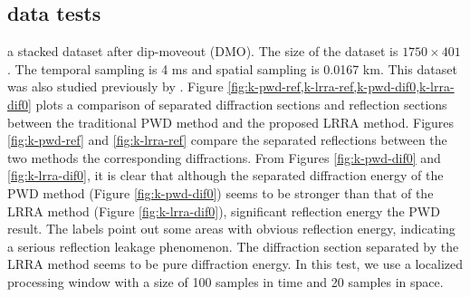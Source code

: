 \subsection{ data tests}
 a stacked dataset after  dip-moveout (DMO). The size of the dataset is $1750\times 401$. The temporal sampling is 4 ms and spatial sampling is 0.0167 km. This dataset was also studied previously by \cite{decker2017diffraction}. Figure \ref{fig:k-pwd-ref,k-lrra-ref,k-pwd-dif0,k-lrra-dif0} plots a comparison of separated diffraction sections and reflection sections between the traditional PWD method and the proposed LRRA method. Figures \ref{fig:k-pwd-ref} and \ref{fig:k-lrra-ref} compare the separated reflections between the two methods the corresponding diffractions. From Figures \ref{fig:k-pwd-dif0} and \ref{fig:k-lrra-dif0}, it is clear that although the separated diffraction energy of the PWD method (Figure \ref{fig:k-pwd-dif0}) seems to be stronger than that of the LRRA method (Figure \ref{fig:k-lrra-dif0}), significant reflection energy  the PWD result. The labels point out some areas with obvious reflection energy, indicating a serious reflection leakage phenomenon. The diffraction section separated by the LRRA method seems to be pure diffraction energy. In this test, we use a localized processing window with a size of 100 samples in time and 20 samples in space. 


